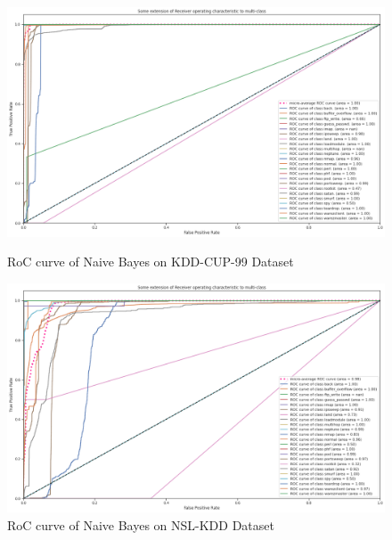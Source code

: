 \documentclass[conference]{IEEEtran}
\begin{document}
\clearpage
\begin{figure}[ht!]
  \centering
  \includegraphics[width=18cm]{GNB_KDD.png}
  \caption{RoC curve of Naive Bayes on KDD-CUP-99 Dataset}
  \label{NB_KDD}

  \vspace*{\floatsep}%

  \includegraphics[width=18cm]{GNB_NSL.png}
  \caption{RoC curve of Naive Bayes on NSL-KDD Dataset}
  \label{NB_NSL}
  
\end{figure}
\end{document}
